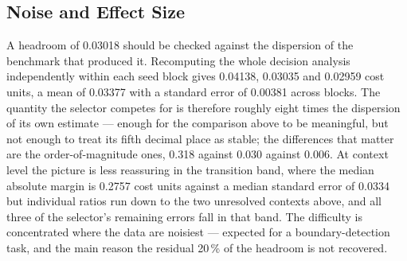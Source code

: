 \subsection{Noise and Effect Size}

A headroom of 0.03018 should be checked against the dispersion of the benchmark that
produced it. Recomputing the whole decision analysis independently within each seed block
gives 0.04138, 0.03035 and 0.02959 cost units, a mean of 0.03377 with a standard error of
0.00381 across blocks. The quantity the selector competes for is therefore roughly eight
times the dispersion of its own estimate --- enough for the comparison above to be
meaningful, but not enough to treat its fifth decimal place as stable; the differences
that matter are the order-of-magnitude ones, 0.318 against 0.030 against 0.006. At context
level the picture is less reassuring in the transition band, where the median absolute
margin is 0.2757 cost units against a median standard error of 0.0334 but individual
ratios run down to the two unresolved contexts above, and all three of the selector's
remaining errors fall in that band. The difficulty is concentrated where the data are
noisiest --- expected for a boundary-detection task, and the main reason the residual
20\,\% of the headroom is not recovered.
